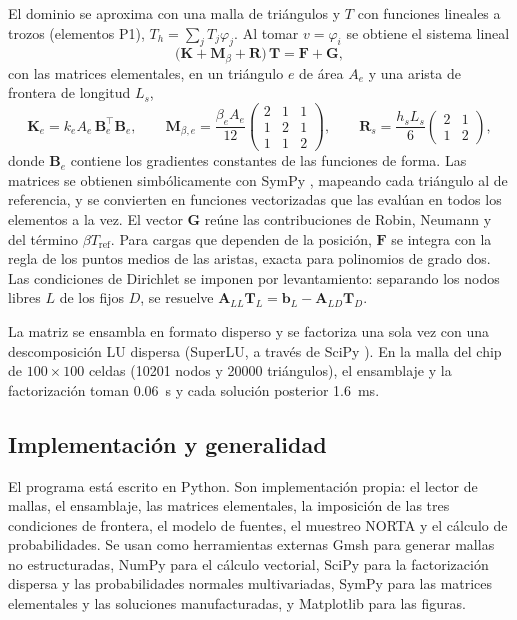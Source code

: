 \documentclass[preprint,11pt,sort&compress]{elsarticle}
\begin{document}
El dominio se aproxima con una malla de triángulos y $T$ con funciones lineales a trozos
(elementos P1), $T_h=\sum_j T_j\varphi_j$. Al tomar $v=\varphi_i$ se obtiene el sistema
lineal
\begin{equation}
  \bigl(\mathbf K+\mathbf M_\beta+\mathbf R\bigr)\,\mathbf T=\mathbf F+\mathbf G,
  \label{eq:sistema}
\end{equation}
con las matrices elementales, en un triángulo $e$ de área $A_e$ y una arista de frontera de
longitud $L_s$,
\begin{equation}
  \mathbf K_e=k_e A_e\,\mathbf B_e^{\!\top}\mathbf B_e,\qquad
  \mathbf M_{\beta,e}=\frac{\beta_e A_e}{12}\begin{pmatrix}2&1&1\\1&2&1\\1&1&2\end{pmatrix},\qquad
  \mathbf R_s=\frac{h_s L_s}{6}\begin{pmatrix}2&1\\1&2\end{pmatrix},
  \label{eq:elementales}
\end{equation}
donde $\mathbf B_e$ contiene los gradientes constantes de las funciones de forma. Las
matrices se obtienen simbólicamente con SymPy \cite{meurer2017sympy}, mapeando cada
triángulo al de referencia, y se convierten en funciones vectorizadas que las evalúan en
todos los elementos a la vez. El vector $\mathbf G$ reúne las contribuciones de Robin,
Neumann y del término $\beta T_{\mathrm{ref}}$. Para cargas que dependen de la posición,
$\mathbf F$ se integra con la regla de los puntos medios de las aristas, exacta para
polinomios de grado dos. Las condiciones de Dirichlet se imponen por levantamiento:
separando los nodos libres $L$ de los fijos $D$, se resuelve
$\mathbf A_{LL}\mathbf T_L=\mathbf b_L-\mathbf A_{LD}\mathbf T_D$.

La matriz se ensambla en formato disperso y se factoriza una sola vez con una
descomposición LU dispersa (SuperLU, a través de SciPy \cite{virtanen2020scipy}). En la
malla del chip de $100\times100$ celdas (\num{10201} nodos y \num{20000} triángulos), el
ensamblaje y la factorización toman \SI{0.06}{\second} y cada solución posterior
\SI{1.6}{\milli\second}.

\subsection{Implementación y generalidad}

El programa está escrito en Python. Son implementación propia: el lector de mallas, el
ensamblaje, las matrices elementales, la imposición de las tres condiciones de frontera,
el modelo de fuentes, el muestreo NORTA y el cálculo de probabilidades. Se usan como
herramientas externas Gmsh \cite{geuzaine2009gmsh} para generar mallas no estructuradas,
NumPy \cite{harris2020numpy} para el cálculo vectorial, SciPy \cite{virtanen2020scipy} para
la factorización dispersa y las probabilidades normales multivariadas, SymPy para las
matrices elementales y las soluciones manufacturadas, y Matplotlib para las figuras.
\end{document}
